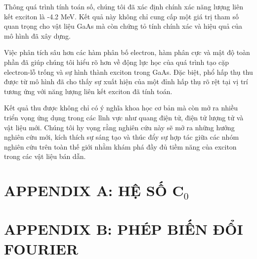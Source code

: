 \documentclass[%
 reprint,
 amsmath,amssymb,
 aps,
]{revtex4-2}
\begin{document}
Thông quá trình tính toán số, chúng tôi đã xác định chính xác năng lượng liên kết exciton là -4.2 MeV. Kết quả này không chỉ cung cấp một giá trị tham số quan trọng cho vật liệu GaAs mà còn chứng tỏ tính chính xác và hiệu quả của mô hình đã xây dựng.

Việc phân tích sâu hơn các hàm phân bố electron, hàm phân cực và mật độ toàn phần đã giúp chúng tôi hiểu rõ hơn về động lực học của quá trình tạo cặp electron-lỗ trống và sự hình thành exciton trong GaAs. Đặc biệt, phổ hấp thụ thu được từ mô hình đã cho thấy sự xuất hiện của một đỉnh hấp thụ rõ rệt tại vị trí tương ứng với năng lượng liên kết exciton đã tính toán.

Kết quả thu được không chỉ có ý nghĩa khoa học cơ bản mà còn mở ra nhiều triển vọng ứng dụng trong các lĩnh vực như quang điện tử, điện tử lượng tử và vật liệu mới. Chúng tôi hy vọng rằng nghiên cứu này sẽ mở ra những hướng nghiên cứu mới, kích thích sự sáng tạo và thúc đẩy sự hợp tác giữa các nhóm nghiên cứu trên toàn thế giới nhằm khám phá đầy đủ tiềm năng của exciton trong các vật liệu bán dẫn.
\section{\label{sec:level5} APPENDIX A: HỆ SỐ $\mathbf{C}_0$}
\section{\label{sec:level6} APPENDIX B: PHÉP BIẾN ĐỔI FOURIER}




\end{document}
